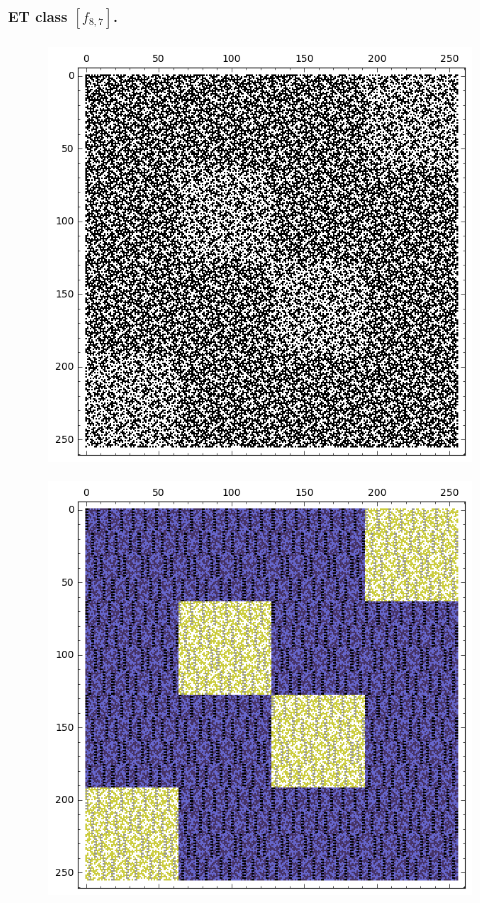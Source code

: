 \documentclass[12pt,a4paper]{article}
\begin{document}
\paragraph*{ET class $[f_{8,7}]$.}
\begin{figure}[!hb]
\centering
\begin{minipage}{.48\textwidth}
  \centering
  \includegraphics[width=.9\linewidth]{../matrix_plot/re8_7_weight_class_matrix.png}
  \label{fig:8_7_weight_class_matrix}
\end{minipage}%
\begin{minipage}{.48\textwidth}
  \centering
  \includegraphics[width=.9\linewidth]{../matrix_plot/re8_7_bent_cayley_graph_index_matrix.png}
  \label{fig:8_7_bent_cayley_graph_index_matrix}
\end{minipage}
\end{figure}
~
\end{document}
